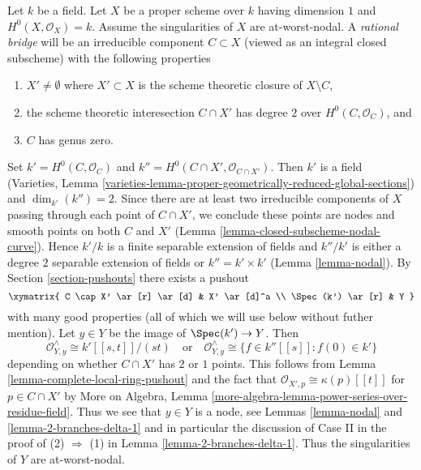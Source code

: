\begin{example}
\label{example-rational-bridge}
Let $k$ be a field. Let $X$ be a proper scheme over $k$ having dimension $1$
and $H^0(X, \mathcal{O}_X) = k$. Assume the singularities of $X$ are
at-worst-nodal.
A {\it rational bridge} will be an irreducible component $C \subset X$
(viewed as an integral closed subscheme) with the following properties
\begin{enumerate}
\item $X' \not = \emptyset$ where $X' \subset X$ is the scheme theoretic closure
of $X \setminus C$,
\item the scheme theoretic interesection $C \cap X'$
has degree $2$ over $H^0(C, \mathcal{O}_C)$, and
\item $C$ has genus zero.
\end{enumerate}
Set $k' = H^0(C, \mathcal{O}_C)$ and
$k'' = H^0(C \cap X', \mathcal{O}_{C \cap X'})$.
Then $k'$ is a field (Varieties, Lemma
\ref{varieties-lemma-proper-geometrically-reduced-global-sections})
and $\dim_{k'}(k'') = 2$. Since there are at least
two irreducible components of $X$ passing through
each point of $C \cap X'$, we conclude these points are nodes
and smooth points on both $C$ and $X'$
(Lemma \ref{lemma-closed-subscheme-nodal-curve}).
Hence $k'/k$ is a finite separable extension of fields
and $k''/k'$ is either a degree $2$ separable extension of fields
or $k'' = k' \times k'$ (Lemma \ref{lemma-nodal}). By
Section \ref{section-pushouts} there exists a pushout
$$
\xymatrix{
C \cap X' \ar[r] \ar[d] &
X' \ar[d]^a \\
\Spec(k') \ar[r] &
Y
}
$$
with many good properties (all of which we will use below without
futher mention). Let $y \in Y$ be the image of $\Spec(k') \to Y$.
Then
$$
\mathcal{O}_{Y, y}^\wedge \cong k'[[s, t]]/(st)
\quad\text{or}\quad
\mathcal{O}_{Y, y}^\wedge \cong
\{f \in k''[[s]] : f(0) \in k'\}
$$
depending on whether $C \cap X'$ has $2$ or $1$ points.
This follows from Lemma \ref{lemma-complete-local-ring-pushout}
and the fact that $\mathcal{O}_{X', p} \cong \kappa(p)[[t]]$
for $p \in C \cap X'$ by More on Algebra, Lemma
\ref{more-algebra-lemma-power-series-over-residue-field}.
Thus we see that $y \in Y$ is a node, see Lemmas \ref{lemma-nodal}
and \ref{lemma-2-branches-delta-1} and in particular the discussion
of Case II in the proof of (2) $\Rightarrow$ (1) in
Lemma \ref{lemma-2-branches-delta-1}.
Thus the singularities of $Y$ are at-worst-nodal.


\end{example}
